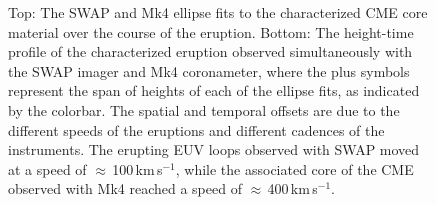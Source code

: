 \documentclass[namedreferences]{solarphysics}
\begin{document}
\begin{article}
\begin{figure}[t]
\caption{Top: The SWAP and Mk4 ellipse fits to the characterized CME core material over the course of the eruption. Bottom: The height-time profile of the characterized eruption observed simultaneously with the SWAP imager and Mk4 coronameter, where the plus symbols represent the span of heights of each of the ellipse fits, as indicated by the colorbar. The spatial and temporal offsets are due to the different speeds of the eruptions and different cadences of the instruments. The erupting EUV loops observed with SWAP moved at a speed of $\approx$\,100\,km\,s$^{-1}$, while the associated core of the CME observed with Mk4 reached a speed of $\approx$\,400\,km\,s$^{-1}$.}
\label{ell_heights_inner}
\end{figure}


\end{article}
\end{document}
